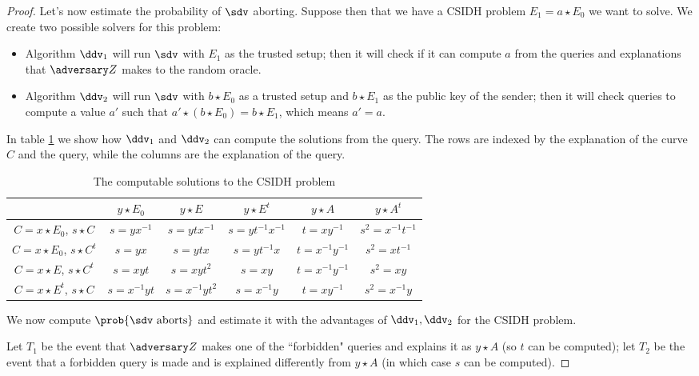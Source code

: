 \begin{proof}
    Let's now estimate the probability of $\sdv$ aborting. Suppose then that we have a CSIDH problem $E_1=a\star E_0$ we want to solve. We create two possible solvers for this problem:
    \begin{itemize}
        \item Algorithm $\ddv_1$ will run $\sdv$ with $E_1$ as the trusted setup; then it will check if it can compute $a$ from the queries and explanations that $\zdv$ makes to the random oracle.
        \item Algorithm $\ddv_2$ will run $\sdv$ with $b\star E_0$ as a trusted setup and $b\star E_1$ as the public key of the sender; then it will check queries to compute a value $a'$ such that $a'\star(b\star E_0)=b\star E_1$, which means $a'=a$.
    \end{itemize}
    
    In table \ref{tab_dlogs} we show how $\ddv_1$ and $\ddv_2$ can compute the solutions from the query. The rows are indexed by the explanation of the curve $C$ and the query, while the columns are the explanation of the query.
    
    \begin{table}[]
        \centering
        \begin{tabular}{c|ccccc}
            & $y\star E_0$ & $y\star E$ & $y\star E^t$ & $y\star A$ & $y\star A^t$ \\
            \hline
            $C=x\star E_0$, $s\star C$ & $s=yx^{-1}$ & $s=ytx^{-1}$ & $s=yt^{-1}x^{-1}$ & $t=xy^{-1}$ & $s^2=x^{-1}t^{-1}$ \\ 
            $C=x\star E_0$, $s\star C^t$ & $s=yx$ & $s=ytx$ & $s=yt^{-1}x$ & $t=x^{-1}y^{-1}$ & $s^2=xt^{-1}$ \\
            $C=x\star E$, $s\star C^t$ & $s=xyt$ & $s=xyt^2$ & $s=xy$ & $t=x^{-1}y^{-1}$ & $s^2=xy$ \\
            $C=x\star E^t$, $s\star C$ & $s=x^{-1}yt$ & $s=x^{-1}yt^2$ & $s=x^{-1}y$ & $t=xy^{-1}$ & $s^2=x^{-1}y$ \\
        \end{tabular}
        \caption{The computable solutions to the CSIDH problem}
        \label{tab_dlogs}
    \end{table}
    
    We now compute $\prob{\sdv\text{ aborts}}$ and estimate it with the advantages of $\ddv_1,\ddv_2$ for the CSIDH problem.
    
    Let $T_1$ be the event that $\zdv$ makes one of the ``forbidden" queries and explains it as $y\star A$ (so $t$ can be computed); let $T_2$ be the event that a forbidden query is made and is explained differently from $y\star A$ (in which case $s$ can be computed).
    

\end{proof}
